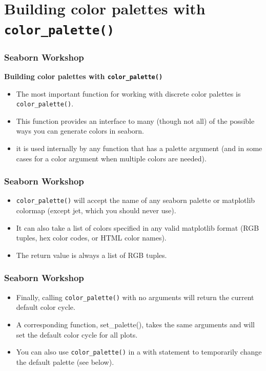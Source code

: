 \documentclass{beamer}
\begin{document}
\section{Building color palettes with \texttt{color\_palette()}}
\begin{frame}[fragile]
\frametitle{Seaborn Workshop}
\Large

\textbf{Building color palettes with \texttt{color\_palette()}}\\
\begin{itemize}
\item The most important function for working with discrete color palettes is \texttt{color\_palette()}.
\item  This function provides an interface to many (though not all) of the possible ways you can generate colors in seaborn.
\item it is used internally by any function that has a palette argument (and in some cases for a color argument when multiple colors are needed).
\end{itemize}

\end{frame}
\begin{frame}[fragile]
	\frametitle{Seaborn Workshop}
	\large
	
\begin{itemize}
\item \texttt{color\_palette()} will accept the name of any seaborn palette or matplotlib colormap (except jet, which you should never use). 
\item It can also take a list of colors specified in any valid matplotlib format (RGB tuples, hex color codes, or HTML color names). \item The return value is always a list of RGB tuples.
\end{itemize}

\end{frame}
\begin{frame}[fragile]
\frametitle{Seaborn Workshop}
\Large
\begin{itemize}
\item Finally, calling \texttt{color\_palette()} with no arguments will return the current default color cycle.

\item A corresponding function, set\_palette(), takes the same arguments and will set the default color cycle for all plots. 
\item You can also use \texttt{color\_palette()} in a with statement to temporarily change the default palette (see below).
\end{itemize}

\end{frame}
\end{document}
